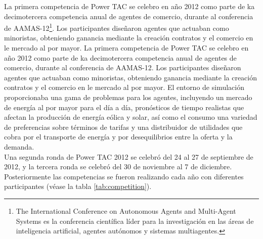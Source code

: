 La primera competencia de Power TAC se celebro en año 2012 como parte de ka decimotercera competencia anual de agentes de comercio, durante al conferencia de AAMAS-12\footnote{The International Conference on Autonomous Agents and Multi-Agent Systems es la conferencia científica líder para la investigación en las áreas de inteligencia artificial, agentes autónomos y sistemas multiagentes.}. Los participantes diseñaron agentes  que actuaban como minoristas, obteniendo ganancia mediante la creación contratos y el comercio en le mercado al por mayor. La primera competencia de Power TAC se celebro en año 2012 como parte de ka decimotercera competencia anual de agentes de comercio, durante al conferencia de AAMAS-12. Los participantes diseñaron agentes  que actuaban como minoristas, obteniendo ganancia mediante la creación contratos y el comercio en le mercado al por mayor. El entorno  de simulación proporcionaba una gama de problemas para los agentes, incluyendo un mercado de energía al por mayor para el día a día, pronósticos de tiempo realistas que afectan la producción de energía eólica y solar, así como el consumo una variedad de preferencias sobre términos de tarifas y una distribuidor de utilidades que cobra por el transporte de energía y por desequilibrios entre la oferta y la demanda.\\

Una segunda ronda de Power TAC 2012 se celebró del 24 al 27 de septiembre de 2012, y la tercera ronda se celebró del 30 de noviembre al 7 de diciembre. Posteriormente las competencias se fueron realizando cada año con diferentes participantes (véase la tabla \ref{tab:competition}).

